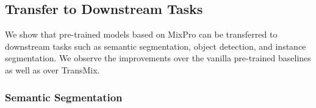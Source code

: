 \documentclass{article} \usepackage{iclr2023_conference,times}
\begin{document}
\vspace{-5px}
\subsection{Transfer to Downstream Tasks}
\label{subTran}

We show that pre-trained models based on MixPro can be transferred to downstream tasks such as semantic segmentation, object detection, and instance segmentation. We observe the improvements over the vanilla pre-trained baselines as well as over TransMix.

\subsubsection{Semantic Segmentation} 

\begin{minipage}{\linewidth}\scriptsize


\end{minipage}
\end{document}
